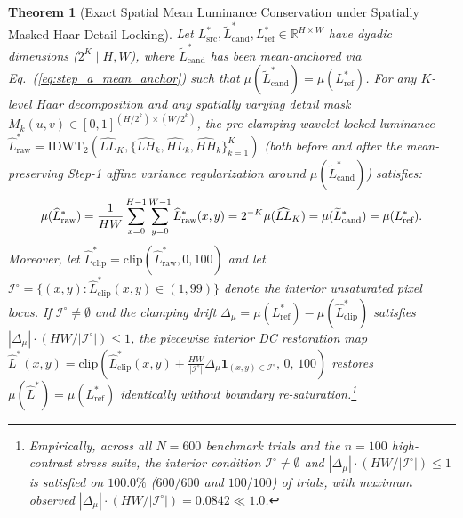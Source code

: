 \documentclass[conference,10pt]{IEEEtran}
\newtheorem{theorem}{Theorem}
\begin{document}
\begin{theorem}[Exact Spatial Mean Luminance Conservation under Spatially Masked Haar Detail Locking]
\label{thm:mean_conservation}
Let $L^*_{\text{src}}, \widetilde{L}^*_{\text{cand}}, L^*_{\text{ref}} \in \mathbb{R}^{H \times W}$ have dyadic dimensions ($2^K \mid H, W$), where $\widetilde{L}^*_{\text{cand}}$ has been mean-anchored via Eq.~(\ref{eq:step_a_mean_anchor}) such that $\mu(\widetilde{L}^*_{\text{cand}}) = \mu(L^*_{\text{ref}})$. For any $K$-level Haar decomposition and any spatially varying detail mask $M_k(u,v) \in [0, 1]^{(H/2^k)\times(W/2^k)}$, the pre-clamping wavelet-locked luminance $\widehat{L}^*_{\text{raw}} = \mathrm{IDWT}_2(\widehat{LL}_K, \{\widehat{LH}_k, \widehat{HL}_k, \widehat{HH}_k\}_{k=1}^K)$ (both before and after the mean-preserving Step-1 affine variance regularization around $\mu(\widetilde{L}^*_{\text{cand}})$) satisfies:
\begin{equation}
\label{eq:thm1_mean}
\resizebox{0.89\columnwidth}{!}{$\displaystyle
\mu(\widehat{L}^*_{\text{raw}}) = \frac{1}{HW} \sum_{x=0}^{H-1} \sum_{y=0}^{W-1} \widehat{L}^*_{\text{raw}}(x,y) = 2^{-K} \mu(\widehat{LL}_K) = \mu(\widetilde{L}^*_{\text{cand}}) = \mu(L^*_{\text{ref}}).
$}
\end{equation}
Moreover, let $\widehat{L}^*_{\text{clip}} = \mathrm{clip}(\widehat{L}^*_{\text{raw}}, 0, 100)$ and let $\mathcal{I}^\circ = \{(x,y) : \widehat{L}^*_{\text{clip}}(x,y) \in (1, 99)\}$ denote the interior unsaturated pixel locus. If $\mathcal{I}^\circ \ne \emptyset$ and the clamping drift $\Delta_\mu = \mu(L^*_{\text{ref}}) - \mu(\widehat{L}^*_{\text{clip}})$ satisfies $|\Delta_\mu| \cdot (HW / |\mathcal{I}^\circ|) \le 1$, the piecewise interior DC restoration map $\widehat{L}^*(x,y) = \mathrm{clip}\!\left(\widehat{L}^*_{\text{clip}}(x,y) + \frac{HW}{|\mathcal{I}^\circ|}\Delta_\mu \mathbf{1}_{(x,y)\in\mathcal{I}^\circ},\, 0,\, 100\right)$ restores $\mu(\widehat{L}^*) = \mu(L^*_{\text{ref}})$ identically without boundary re-saturation.\footnote{Empirically, across all $N=600$ benchmark trials and the $n=100$ high-contrast stress suite, the interior condition $\mathcal{I}^\circ \ne \emptyset$ and $|\Delta_\mu| \cdot (HW/|\mathcal{I}^\circ|) \le 1$ is satisfied on $100.0\%$ ($600/600$ and $100/100$) of trials, with maximum observed $|\Delta_\mu| \cdot (HW/|\mathcal{I}^\circ|) = 0.0842 \ll 1.0$.}
\end{theorem}
\end{document}
